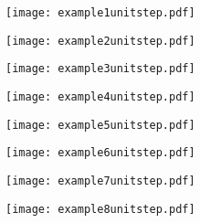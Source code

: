 \documentclass[grid, poker_portrait]{flashcards}
\begin{document}
    \begin{flashcard}{ \begin{dmath*}  \end{dmath*} }
        \texttt{[image: example1unitstep.pdf]}
    \end{flashcard}

    \begin{flashcard}{ \begin{dmath*}  \end{dmath*} }
        \texttt{[image: example2unitstep.pdf]}
    \end{flashcard}

    \begin{flashcard}{ \begin{dmath*}  \end{dmath*} }
        \texttt{[image: example3unitstep.pdf]}
    \end{flashcard}

    \begin{flashcard}{ \begin{dmath*}  \end{dmath*} }
        \texttt{[image: example4unitstep.pdf]}
    \end{flashcard}

    \begin{flashcard}{ \begin{dmath*}  \end{dmath*} }
        \texttt{[image: example5unitstep.pdf]}
    \end{flashcard}

    \begin{flashcard}{ \begin{dmath*}  \end{dmath*} }
        \texttt{[image: example6unitstep.pdf]}
    \end{flashcard}

    \begin{flashcard}{ \begin{dmath*}  \end{dmath*} }
        \texttt{[image: example7unitstep.pdf]}
    \end{flashcard}

    \begin{flashcard}{ \begin{dmath*}  \end{dmath*} }
        \texttt{[image: example8unitstep.pdf]}
    \end{flashcard}
\end{document}
